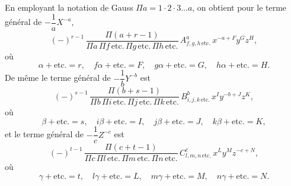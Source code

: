 \documentclass[11pt,a4paper]{book}
\theoremstyle{plain}
\begin{document}
En employant la notation de Gauss $\Pi a=1\cdot 2\cdot 3\ldots a$, on obtient pour le terme g\'{e}n\'{e}ral de $-\dfrac{1}{a}X^{-a}$,
\[
(-)^{r-1}\,\frac{\Pi(a+r-1)}{\Pi a\,\Pi f\,\text{etc.}\,\Pi g\,\text{etc.}\,\Pi h\,\text{etc.}}\,A^a_{f,g,h\,\text{etc.}}\,x^{-a+F}y^G z^H,
\]
o\`{u}
\[
\alpha+\text{etc.}=r,\quad f\alpha+\text{etc.}=F,\quad g\alpha+\text{etc.}=G,\quad h\alpha+\text{etc.}=H.
\]
De m\^{e}me le terme g\'{e}n\'{e}ral de $-\dfrac{1}{b}Y^{-b}$ est
\[
(-)^{s-1}\,\frac{\Pi(b+s-1)}{\Pi b\,\Pi i\,\text{etc.}\,\Pi j\,\text{etc.}\,\Pi k\,\text{etc.}}\,B^b_{i,j,k\,\text{etc.}}\,x^I y^{-b+J} z^K,
\]
o\`{u}
\[
\beta+\text{etc.}=s,\quad i\beta+\text{etc.}=I,\quad j\beta+\text{etc.}=J,\quad k\beta+\text{etc.}=K,
\]
et le terme g\'{e}n\'{e}ral de $-\dfrac{1}{c}Z^{-c}$ est
\[
(-)^{t-1}\,\frac{\Pi(c+t-1)}{\Pi c\,\Pi l\,\text{etc.}\,\Pi m\,\text{etc.}\,\Pi n\,\text{etc.}}\,C^c_{l,m,n\,\text{etc.}}\,x^L y^M z^{-c+N},
\]
o\`{u}
\[
\gamma+\text{etc.}=t,\quad l\gamma+\text{etc.}=L,\quad m\gamma+\text{etc.}=M,\quad n\gamma+\text{etc.}=N.
\]
\end{document}
